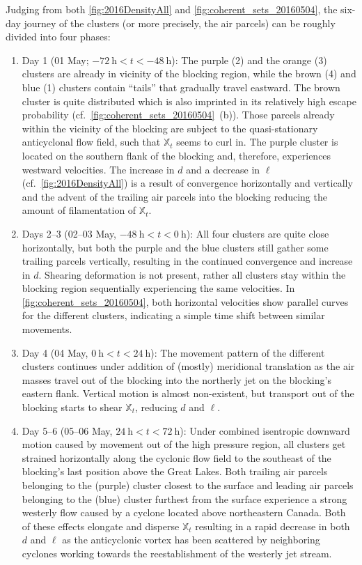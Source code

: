 Judging from both \cref{fig:2016DensityAll} and \cref{fig:coherent_sets_20160504}, the six-day journey of the clusters (or more precisely, the air parcels) can be roughly divided into four phases:

\begin{enumerate}
    \item Day 1 (01 May; $-72~\mathrm{h} < t < -48~\mathrm{h}$): The purple (2) and the orange (3) clusters are already in vicinity of the blocking region, while the brown (4) and blue (1)  clusters contain \enquote{tails} that gradually travel eastward. The brown cluster is quite distributed which is also imprinted in its relatively high escape probability (cf.~\cref{fig:coherent_sets_20160504}~(b)). Those parcels already within the vicinity of the blocking are subject to the quasi-stationary anticyclonal flow field, such that $\mathbb{X}_t$ seems to curl in. The purple cluster is located on the southern flank of the blocking and, therefore, experiences westward velocities. The increase in $d$ and a decrease in $\ell$ (cf.~\cref{fig:2016DensityAll}) is a result of convergence horizontally and vertically and the advent of the trailing air parcels into the blocking reducing the amount of filamentation of $\mathbb{X}_t$.
    \item Days 2--3 (02--03 May, $-48~\mathrm{h} < t < 0~\mathrm{h}$): All four clusters are quite close horizontally, but both the purple and the blue clusters still gather some trailing parcels vertically, resulting in the continued convergence and increase in $d$. Shearing deformation is not present, rather all clusters stay within the blocking region sequentially experiencing the same velocities. In \cref{fig:coherent_sets_20160504}, both horizontal velocities show parallel curves for the different clusters, indicating a simple time shift between similar movements.
    \item Day 4 (04 May, $0~\mathrm{h} < t < 24~\mathrm{h}$): The movement pattern of the different clusters continues under addition of (mostly) meridional translation as the air masses travel out of the blocking into the northerly jet on the blocking's eastern flank. Vertical motion is almost non-existent, but transport out of the blocking starts to shear $\mathbb{X}_t$, reducing $d$ and $\ell$.
    \item Day 5--6 (05--06 May, $24~\mathrm{h} < t < 72~\mathrm{h}$): Under combined isentropic downward motion caused by movement out of the high pressure region, all clusters get strained horizontally along the cyclonic flow field to the southeast of the blocking's last position above the Great Lakes. Both trailing air parcels belonging to the (purple) cluster closest to the surface and leading air parcels belonging to the (blue) cluster furthest from the surface experience a strong westerly flow caused by a cyclone located above northeastern Canada. Both of these effects elongate and disperse $\mathbb{X}_t$ resulting in a rapid decrease in both $d$ and $\ell$ as the anticyclonic vortex has been scattered by neighboring cyclones working towards the reestablishment of the westerly jet stream.
\end{enumerate}

